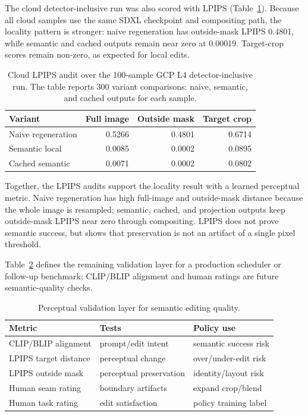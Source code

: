\documentclass[final,5p,times,number,sort&compress]{elsarticle}
\begin{document}
The cloud detector-inclusive run was also scored with LPIPS (Table~\ref{tab:cloud-lpips-results}). Because all cloud samples use the same SDXL checkpoint and compositing path, the locality pattern is stronger: naive regeneration has outside-mask LPIPS 0.4801, while semantic and cached outputs remain near zero at 0.00019. Target-crop scores remain non-zero, as expected for local edits.

\begin{table}[t]
\centering
\scriptsize
\caption{Cloud LPIPS audit over the 100-sample GCP L4 detector-inclusive run. The table reports 300 variant comparisons: naive, semantic, and cached outputs for each sample.}
\label{tab:cloud-lpips-results}
\begin{tabular}{lrrr}
\toprule
Variant & Full image & Outside mask & Target crop \\
\midrule
Naive regeneration & 0.5266 & 0.4801 & 0.6714 \\
Semantic local & 0.0085 & 0.0002 & 0.0895 \\
Cached semantic & 0.0071 & 0.0002 & 0.0802 \\
\bottomrule
\end{tabular}
\end{table}

Together, the LPIPS audits support the locality result with a learned perceptual metric. Naive regeneration has high full-image and outside-mask distance because the whole image is resampled; semantic, cached, and projection outputs keep outside-mask LPIPS near zero through compositing. LPIPS does not prove semantic success, but shows that preservation is not an artifact of a single pixel threshold.

Table~\ref{tab:perceptual-layer} defines the remaining validation layer for a production scheduler or follow-up benchmark; CLIP/BLIP alignment and human ratings are future semantic-quality checks.

\begin{table}[t]
\centering
\scriptsize
\caption{Perceptual validation layer for semantic editing quality.}
\label{tab:perceptual-layer}
\begin{tabular}{@{}p{}p{}p{}@{}}
\toprule
Metric & Tests & Policy use \\
\midrule
CLIP/BLIP alignment & prompt/edit intent & semantic success risk \\
LPIPS target distance & perceptual change & over/under-edit risk \\
LPIPS outside mask & perceptual preservation & identity/layout risk \\
Human seam rating & boundary artifacts & expand crop/blend \\
Human task rating & edit satisfaction & policy training label \\
\bottomrule
\end{tabular}
\end{table}
\end{document}
